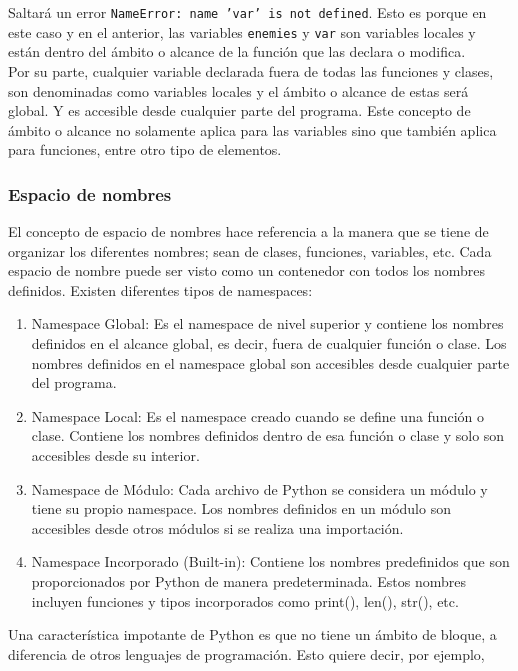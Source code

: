 Saltará un error \texttt{NameError: name 'var' is not defined}. Esto es porque en este caso y en el anterior, las variables \texttt{enemies} y \texttt{var} son variables locales y están dentro del ámbito o alcance de la función que las declara o modifica.\\

Por su parte, cualquier variable declarada fuera de todas las funciones y clases, son denominadas como variables locales y el ámbito o alcance de estas será global. Y es accesible desde cualquier parte del programa. Este concepto de ámbito o alcance no solamente aplica para las variables sino que también aplica para funciones, entre otro tipo de elementos.

\subsubsection{Espacio de nombres}

El concepto de espacio de nombres hace referencia a la manera que se tiene de organizar los diferentes nombres; sean de clases, funciones, variables, etc. Cada espacio de nombre puede ser visto como un contenedor con todos los nombres definidos. Existen diferentes tipos de namespaces:

\begin{enumerate}
    \item Namespace Global: Es el namespace de nivel superior y contiene los nombres definidos en el alcance global, es decir, fuera de cualquier función o clase. Los nombres definidos en el namespace global son accesibles desde cualquier parte del programa.
    \item Namespace Local: Es el namespace creado cuando se define una función o clase. Contiene los nombres definidos dentro de esa función o clase y solo son accesibles desde su interior.
    \item Namespace de Módulo: Cada archivo de Python se considera un módulo y tiene su propio namespace. Los nombres definidos en un módulo son accesibles desde otros módulos si se realiza una importación.
    \item Namespace Incorporado (Built-in): Contiene los nombres predefinidos que son proporcionados por Python de manera predeterminada. Estos nombres incluyen funciones y tipos incorporados como print(), len(), str(), etc.
\end{enumerate}

Una característica impotante de Python es que no tiene un ámbito de bloque, a diferencia de otros lenguajes de programación. Esto quiere decir, por ejemplo, 


